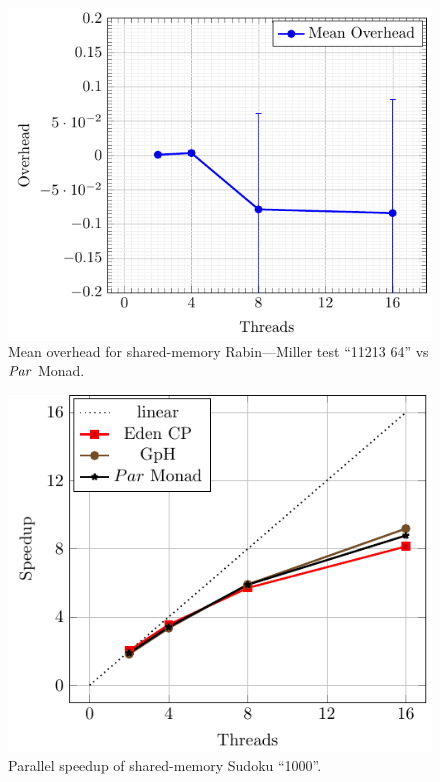 \documentclass[paper=A4,twoside=true,openright,parskip=full,chapterprefix=true,headings=normal,bibliography=totoc,listof=totoc,titlepage=on,captions=tableabove,draft=false,british]{scrreprt}%
\renewcommand{\enquote}[1]{{``}#1{''}}
\begin{document}
\begin{figure}
\centering
\includegraphics{src/img/overSMRM64Par.pdf}
\caption{Mean overhead for shared-memory Rabin---Miller test
\enquote{11213 64} vs \ensuremath{\Conid{Par}} Monad.\label{fig:overSMRM64Par}}
\end{figure}

\begin{figure}
\centering
\includegraphics{src/img/perfSMSudoku.pdf}
\caption{Parallel speedup of shared-memory Sudoku
\enquote{1000}.\label{fig:perfSMSudoku}}
\end{figure}
\end{document}
